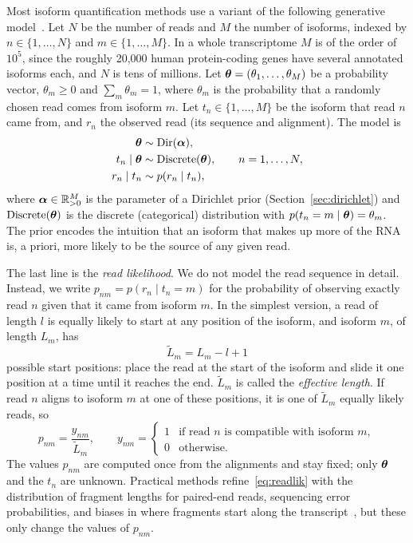 Most isoform quantification methods use a variant of the following generative model~\citep{glaus2012,nariai2013,hensman2015}. Let $N$ be the number of reads and $M$ the number of isoforms, indexed by $n\in\{1,\dots,N\}$ and $m\in\{1,\dots,M\}$. In a whole transcriptome $M$ is of the order of $10^5$, since the roughly 20,000 human protein-coding genes have several annotated isoforms each, and $N$ is tens of millions. Let $\boldsymbol{\theta}=(\theta_1,\dots,\theta_M)$ be a probability vector, $\theta_m\geq 0$ and $\sum_m\theta_m=1$, where $\theta_m$ is the probability that a randomly chosen read comes from isoform $m$. Let $t_n\in\{1,\dots,M\}$ be the isoform that read $n$ came from, and $r_n$ the observed read (its sequence and alignment). The model is
\begin{align}
  \boldsymbol{\theta} &\sim \operatorname{Dir}(\boldsymbol{\alpha}), \nonumber\\
  t_n\mid\boldsymbol{\theta} &\sim \operatorname{Discrete}(\boldsymbol{\theta}), \qquad n=1,\dots,N, \label{eq:genmodel}\\
  r_n\mid t_n &\sim p(r_n\mid t_n), \nonumber
\end{align}
where $\boldsymbol{\alpha}\in\mathbb{R}_{>0}^M$ is the parameter of a Dirichlet prior (Section~\ref{sec:dirichlet}) and $\operatorname{Discrete}(\boldsymbol{\theta})$ is the discrete (categorical) distribution with $p(t_n=m\mid\boldsymbol{\theta})=\theta_m$. The prior encodes the intuition that an isoform that makes up more of the RNA is, a priori, more likely to be the source of any given read.

The last line is the \emph{read likelihood}. We do not model the read sequence in detail. Instead, we write $p_{nm}=p(r_n\mid t_n=m)$ for the probability of observing exactly read $n$ given that it came from isoform $m$. In the simplest version, a read of length $l$ is equally likely to start at any position of the isoform, and isoform $m$, of length $L_m$, has
\begin{equation}
  \tilde L_m = L_m - l + 1
\end{equation}
possible start positions: place the read at the start of the isoform and slide it one position at a time until it reaches the end. $\tilde L_m$ is called the \emph{effective length}. If read $n$ aligns to isoform $m$ at one of these positions, it is one of $\tilde L_m$ equally likely reads, so
\begin{equation}
  p_{nm} = \frac{y_{nm}}{\tilde L_m}, \qquad
  y_{nm} = \begin{cases} 1 & \text{if read $n$ is compatible with isoform $m$},\\ 0 & \text{otherwise}. \end{cases}
  \label{eq:readlik}
\end{equation}
The values $p_{nm}$ are computed once from the alignments and stay fixed; only $\boldsymbol{\theta}$ and the $t_n$ are unknown. Practical methods refine~\eqref{eq:readlik} with the distribution of fragment lengths for paired-end reads, sequencing error probabilities, and biases in where fragments start along the transcript~\citep{li2011rsem,glaus2012,patro2017}, but these only change the values of $p_{nm}$.

